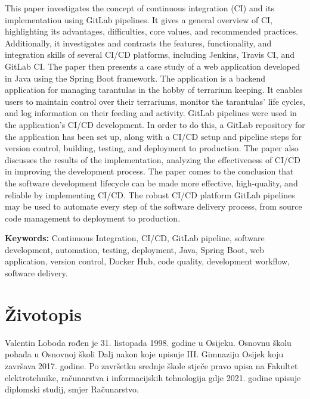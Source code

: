 \documentclass[a4paper,12pt,oneside]{article}
\begin{document}
This paper investigates the concept of continuous integration (CI) and its implementation using GitLab pipelines.  It gives a general overview of CI, highlighting its advantages, difficulties, core values, and recommended practices. Additionally, it investigates and contrasts the features, functionality, and integration skills of several CI/CD platforms, including Jenkins, Travis CI, and GitLab CI. The paper then presents a case study of a web application developed in Java using the Spring Boot framework. The application is a backend application for managing tarantulas in the hobby of terrarium keeping.  It enables users to maintain control over their terrariums, monitor the tarantulas' life cycles, and log information on their feeding and activity. GitLab pipelines were used in the application's CI/CD development. In order to do this, a GitLab repository for the application has been set up, along with a CI/CD setup and pipeline steps for version control, building, testing, and deployment to production. The paper also discusses the results of the implementation, analyzing the effectiveness of CI/CD in improving the development process. The paper comes to the conclusion that the software development lifecycle can be made more effective, high-quality, and reliable by implementing CI/CD. The robust CI/CD platform GitLab pipelines may be used to automate every step of the software delivery process, from source code management to deployment to production. 

\bigskip
\noindent\textbf{Keywords:}  Continuous Integration, CI/CD, GitLab pipeline, software development, automation, testing, deployment, Java, Spring Boot, web application, version control, Docker Hub, code quality, development workflow, software delivery.

\newpage

\printbibliography[heading=bibintoc]

\newpage
\section*{Životopis}

Valentin Loboda rođen je 31. listopada 1998. godine u Osijeku. Osnovnu školu pohađa u 
Osnovnoj školi Dalj nakon koje upisuje III. Gimnaziju Osijek koju završava 2017. godine. Po 
završetku srednje škole stječe pravo upisa na Fakultet elektrotehnike, računarstva i informacijskih 
tehnologija gdje 2021. godine upisuje diplomski studij, smjer Računarstvo.
\end{document}
